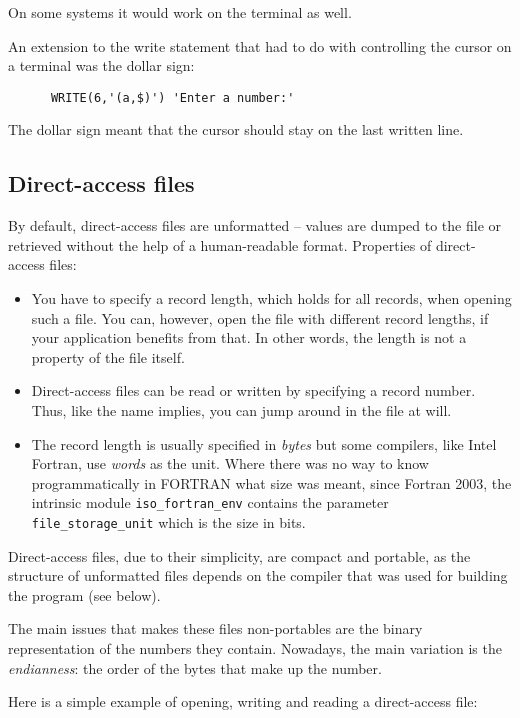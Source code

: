 On some systems it would work on the terminal as well.

An extension to the write statement that had to do with controlling the cursor on a
terminal was the dollar sign:
\begin{verbatim}
      WRITE(6,'(a,$)') 'Enter a number:'
\end{verbatim}

The dollar sign meant that the cursor should stay on the last written line.


\subsection{Direct-access files}
By default, direct-access files are unformatted -- values are dumped to the file or retrieved
without the help of a human-readable format. Properties of direct-access files:
\begin{itemize}
\item
You have to specify a record length, which holds for all records, when opening such a file.
You can, however, open the file with different record lengths, if your application benefits
from that. In other words, the length is not a property of the file itself.
\item
Direct-access files can be read or written by specifying a record number. Thus, like the name
implies, you can jump around in the file at will.
\item
The record length is usually specified in \emph{bytes} but some compilers, like Intel Fortran,
use \emph{words} as the unit. Where there was no way to know programmatically in FORTRAN what
size was meant, since Fortran 2003, the intrinsic module \verb+iso_fortran_env+ contains the parameter \verb+file_storage_unit+
which is the size in bits.
\end{itemize}

Direct-access files, due to their simplicity, are compact and portable, as the structure of
unformatted files depends on the compiler that was used for building the program (see below).

The main issues that makes these files non-portables are the binary representation of the
numbers they contain. Nowadays, the main variation is the \emph{endianness}: the order of the
bytes that make up the number.

Here is a simple example of opening, writing and reading a direct-access file:

